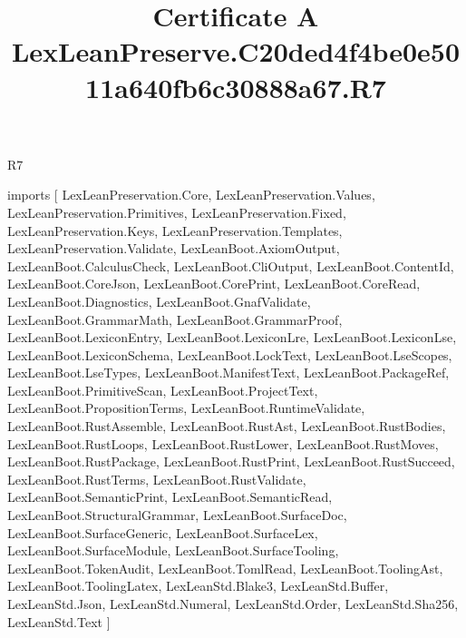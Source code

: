\begin{lexlean}{R7}
\title{Certificate A LexLeanPreserve.C20ded4f4be0e5011a640fb6c30888a67.R7}
\begin{coremodule}
imports [
  LexLeanPreservation.Core,
  LexLeanPreservation.Values,
  LexLeanPreservation.Primitives,
  LexLeanPreservation.Fixed,
  LexLeanPreservation.Keys,
  LexLeanPreservation.Templates,
  LexLeanPreservation.Validate,
  LexLeanBoot.AxiomOutput,
  LexLeanBoot.CalculusCheck,
  LexLeanBoot.CliOutput,
  LexLeanBoot.ContentId,
  LexLeanBoot.CoreJson,
  LexLeanBoot.CorePrint,
  LexLeanBoot.CoreRead,
  LexLeanBoot.Diagnostics,
  LexLeanBoot.GnafValidate,
  LexLeanBoot.GrammarMath,
  LexLeanBoot.GrammarProof,
  LexLeanBoot.LexiconEntry,
  LexLeanBoot.LexiconLre,
  LexLeanBoot.LexiconLse,
  LexLeanBoot.LexiconSchema,
  LexLeanBoot.LockText,
  LexLeanBoot.LseScopes,
  LexLeanBoot.LseTypes,
  LexLeanBoot.ManifestText,
  LexLeanBoot.PackageRef,
  LexLeanBoot.PrimitiveScan,
  LexLeanBoot.ProjectText,
  LexLeanBoot.PropositionTerms,
  LexLeanBoot.RuntimeValidate,
  LexLeanBoot.RustAssemble,
  LexLeanBoot.RustAst,
  LexLeanBoot.RustBodies,
  LexLeanBoot.RustLoops,
  LexLeanBoot.RustLower,
  LexLeanBoot.RustMoves,
  LexLeanBoot.RustPackage,
  LexLeanBoot.RustPrint,
  LexLeanBoot.RustSucceed,
  LexLeanBoot.RustTerms,
  LexLeanBoot.RustValidate,
  LexLeanBoot.SemanticPrint,
  LexLeanBoot.SemanticRead,
  LexLeanBoot.StructuralGrammar,
  LexLeanBoot.SurfaceDoc,
  LexLeanBoot.SurfaceGeneric,
  LexLeanBoot.SurfaceLex,
  LexLeanBoot.SurfaceModule,
  LexLeanBoot.SurfaceTooling,
  LexLeanBoot.TokenAudit,
  LexLeanBoot.TomlRead,
  LexLeanBoot.ToolingAst,
  LexLeanBoot.ToolingLatex,
  LexLeanStd.Blake3,
  LexLeanStd.Buffer,
  LexLeanStd.Json,
  LexLeanStd.Numeral,
  LexLeanStd.Order,
  LexLeanStd.Sha256,
  LexLeanStd.Text
]


\end{coremodule}
\end{lexlean}

